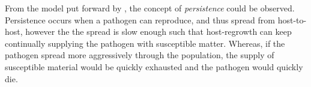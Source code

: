 From the model put forward by \cite{park2001invasion}, the concept of \textit{persistence} could be observed. Persistence occurs when a pathogen can reproduce, and thus spread from host-to-host, however the the spread is slow enough such that host-regrowth can keep continually supplying the pathogen with susceptible matter. Whereas, if the pathogen spread more aggressively through the population, the supply of susceptible material would be quickly exhausted and the pathogen would quickly die.\\

